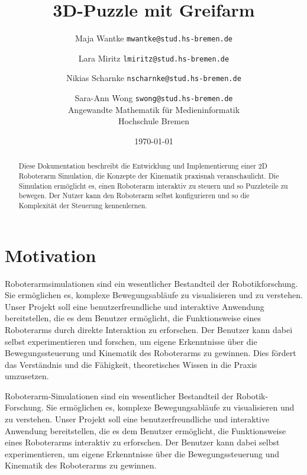 \documentclass[12pt]{article}
\title{3D-Puzzle mit Greifarm}
\author{
    Maja Wantke \texttt{mwantke@stud.hs-bremen.de} \and
    Lara Miritz \texttt{lmiritz@stud.hs-bremen.de} \and
    Nikias Scharnke \texttt{nscharnke@stud.hs-bremen.de} \and
    Sara-Ann Wong \texttt{swong@stud.hs-bremen.de} \\
    Angewandte Mathematik für Medieninformatik \\
    Hochschule Bremen}
\date{ \today}
\begin{document}
    \maketitle

    \begin{abstract}
        Diese Dokumentation beschreibt die Entwicklung und Implementierung einer 2D Roboterarm Simulation, die Konzepte
        der Kinematik praxisnah veranschaulicht. Die Simulation ermöglicht es, einen Roboterarm interaktiv zu steuern
        und so Puzzleteile zu bewegen. Der Nutzer kann den Roboterarm selbst konfigurieren und so die
        Komplexität der Steuerung kennenlernen.
    \end{abstract}
    \clearpage
    \tableofcontents
    \clearpage
    \listoffigures
    \clearpage
    \renewcommand{\lstlistlistingname}{Quellcode Verzeichnis}
    \lstlistoflistings
    \clearpage


    \section{Motivation}
    Roboterarmsimulationen sind ein wesentlicher Bestandteil der Robotikforschung. Sie ermöglichen es,
    komplexe Bewegungsabläufe zu visualisieren und zu verstehen. Unser Projekt soll eine benutzerfreundliche
    und interaktive Anwendung bereitstellen, die es dem Benutzer ermöglicht, die Funktionsweise eines
    Roboterarms durch direkte Interaktion zu erforschen. Der Benutzer kann dabei selbst experimentieren
    und forschen, um eigene Erkenntnisse über die Bewegungssteuerung und Kinematik des Roboterarms zu gewinnen.
    Dies fördert das Verständnis und die Fähigkeit, theoretisches Wissen in die Praxis umzusetzen.

    Roboterarm-Simulationen sind ein wesentlicher Bestandteil der Robotik-Forschung. Sie ermöglichen es,
    komplexe Bewegungsabläufe zu visualisieren und zu verstehen. Unser Projekt soll eine benutzerfreundliche
    und interaktive Anwendung bereitstellen, die es dem Benutzer ermöglicht, die Funktionsweise eines Roboterarms
    interaktiv zu erforschen. Der Benutzer kann dabei selbst experimentieren, um eigene Erkenntnisse über die
    Bewegungssteuerung und Kinematik des Roboterarms zu gewinnen.
\end{document}
